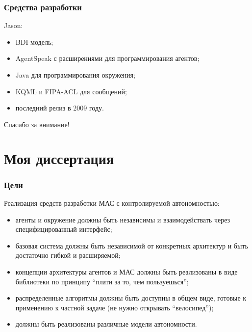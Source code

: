 \documentclass{beamer}
\begin{document}
\begin{frame}
  \frametitle{Средства разработки}
  Jason:
  \begin{itemize}
    \item BDI-модель;
    \item AgentSpeak с расширениями для программирования агентов;
    \item Java для программирования окружения;
    \item KQML и FIPA-ACL для сообщений;
    \item последний релиз в 2009 году.
  \end{itemize}
\end{frame}

\begin{frame}{}
\addtocounter{framenumber}{-1}
\begin{center}
\LARGE{Спасибо за внимание!}
\end{center}
\end{frame}

\section{Моя диссертация}

\begin{frame}
  \frametitle{Цели}
  Реализация средств разработки МАС с контролируемой автономностью:
  \begin{itemize}
    \item агенты и окружение должны быть независимы и взаимодействать через
      специфицированный интерфейс;
    \item базовая система должны быть независимой от конкретных архитектур и
      быть достаточно гибкой и расширяемой;
    \item концепции архитектуры агентов и МАС должны быть реализованы в виде библиотеки
      по принципу ``плати за то, чем пользуешься'';
    \item распределенные алгоритмы должны быть доступны в общем виде, готовые к применению
      к частной задаче (не нужно открывать ``велосипед'');
    \item должны быть реализованы различные модели автономности.
  \end{itemize}
\end{frame}
\end{document}
